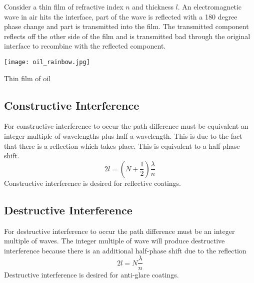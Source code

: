  Consider a thin film of refractive index $n$ and thickness $l$.  An electromagnetic wave in air hits the interface, part of the wave is reflected with a 180 degree phase change and part is transmitted into the film.  The transmitted component reflects off the other side of the film and is transmitted bad through the original interface to recombine with the reflected component.
 \begin{marginfigure}[-40pt]
  \texttt{[image: oil\_rainbow.jpg]}
  \caption{Thin film of oil}
  \label{fig:marginfig}
\end{marginfigure}


 \subsection{Constructive Interference}
 For constructive interference to occur the path difference must be equivalent an integer multiple of wavelengths plus half a wavelength.  This is due to the fact that there is a reflection which takes place.  This is equivalent to a half-phase shift.
 $$2l=\left(N+\frac{1}{2}\right)\frac{\lambda}{n}$$
 Constructive interference is desired for reflective coatings.
  \subsection{Destructive Interference}
  For destructive interference to occur the path difference must be an integer multiple of waves.  The integer multiple of wave will produce destructive interference because there is an additional half-phase shift due to the reflection
 $$2l=N\frac{\lambda}{n}$$
 Destructive interference is desired for anti-glare coatings.
 
